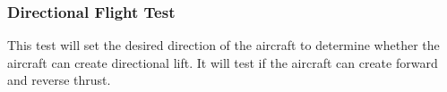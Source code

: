                 \subsubsection{Directional Flight Test}
                    This test will set the desired direction of the aircraft to determine whether the aircraft can create directional lift. It will test if the aircraft can create forward and reverse thrust.
